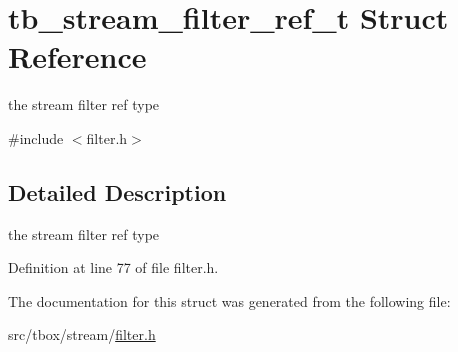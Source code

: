 \hypertarget{structtb__stream__filter__ref__t}{\section{tb\-\_\-stream\-\_\-filter\-\_\-ref\-\_\-t Struct Reference}
\label{structtb__stream__filter__ref__t}
}


the stream filter ref type  




{\ttfamily \#include $<$filter.\-h$>$}



\subsection{Detailed Description}
the stream filter ref type 

Definition at line 77 of file filter.\-h.



The documentation for this struct was generated from the following file\-:\begin{DoxyCompactItemize}
\item 
src/tbox/stream/\hyperlink{filter_8h}{filter.\-h}\end{DoxyCompactItemize}
